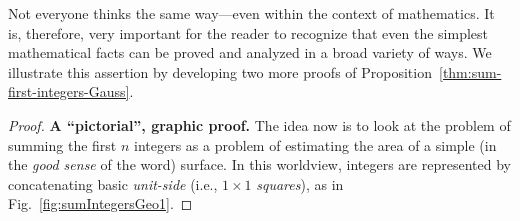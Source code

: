 \medskip

Not everyone thinks the same way---even within the context of
mathematics.  It is, therefore, very important for the reader to
recognize that even the simplest mathematical facts can be proved and
analyzed in a broad variety of ways.  We illustrate this assertion by
developing two more proofs of
Proposition~\ref{thm:sum-first-integers-Gauss}.

\begin{proof}
{\bf A ``pictorial'', graphic proof.}
%
The idea now is to look at the problem of summing the first $n$
integers as a problem of estimating the area of a simple (in the
\textit{good sense} of the word) surface.  In this worldview, integers
are represented by concatenating basic {\it unit-side} (i.e., $1
\times 1$  {\it squares}), as in
Fig.~\ref{fig:sumIntegersGeo1}.


\end{proof}
